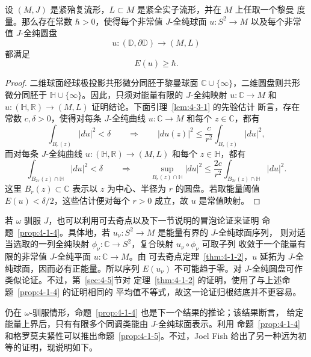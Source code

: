 \begin{proposition}\label{prop:4-1-4}
设 $(M,J)$ 是紧殆复流形，$L\subset M$ 是紧全实子流形，并在 $M$ 上任取一个黎曼
度量。那么存在常数 $\hbar>0$，使得每个非常值 $J$-全纯球面
$u:S^2\to M$ 以及每个非常值 $J$-全纯圆盘
\[
  u:(\mathbb D,\partial\mathbb D)\longrightarrow(M,L)
\]
都满足
\[
  E(u)\ge\hbar.
\]
\end{proposition}

\begin{proof}
二维球面经球极投影共形微分同胚于黎曼球面
$\mathbb C\cup\{\infty\}$，二维圆盘则共形微分同胚于
$\mathbb H\cup\{\infty\}$。因此，只须对能量有限的 $J$-全纯映射
$u:\mathbb C\to M$ 和
$u:(\mathbb H,\mathbb R)\to(M,L)$ 证明结论。下面引理~\ref{lem:4-3-1} 的先验估计
断言，存在常数 $c,\delta>0$，使得对每条 $J$-全纯曲线 $u:\mathbb C\to M$ 和每个
$z\in\mathbb C$，都有
\[
  \int_{B_r(z)}|du|^2<\delta
  \qquad\Longrightarrow\qquad
  |du(z)|^2
  \le\frac{c}{r^2}\int_{B_r(z)}|du|^2,
\]
而对每条 $J$-全纯曲线
$u:(\mathbb H,\mathbb R)\to(M,L)$ 和每个 $z\in\mathbb H$，都有
\[
  \int_{B_{2r}(z)\cap\mathbb H}|du|^2<\delta
  \qquad\Longrightarrow\qquad
  \sup_{B_r(z)\cap\mathbb H}|du|^2
  \le\frac{2c}{r^2}
  \int_{B_{2r}(z)\cap\mathbb H}|du|^2.
\]
这里 $B_r(z)\subset\mathbb C$ 表示以 $z$ 为中心、半径为 $r$ 的圆盘。若取能量阈值
$E(u)<\delta/2$，这些估计便对每个 $r>0$ 成立，故 $u$ 是常值映射。
\end{proof}

若 $\omega$ 驯服 $J$，也可以利用可去奇点以及下一节说明的冒泡论证来证明
命题~\ref{prop:4-1-4}。具体地，若 $u_\nu:S^2\to M$ 是能量有界的 $J$-全纯球面序列，
则对适当选取的一列全纯映射 $\phi_\nu:\mathbb C\to S^2$，复合映射
$u_\nu\circ\phi_\nu$ 可取子列
收敛于一个能量有限的非常值 $J$-全纯平面 $u:\mathbb C\to M$。由
可去奇点定理~\ref{thm:4-1-2}，$u$ 延拓为 $J$-全纯球面，因而必有正能量。所以序列
$E(u_\nu)$ 不可能趋于零。对 $J$-全纯圆盘可作类似论证。不过，第~\ref{sec:4-5}节对
定理~\ref{thm:4-1-2} 的证明，使用了与上述命题~\ref{prop:4-1-4} 的证明相同的
平均值不等式，故这一论证归根结底并不更容易。

仍在 $\omega$-驯服情形，命题~\ref{prop:4-1-4} 也是下一个结果的推论；该结果断言，
给定能量上界后，只有有限多个同调类能由 $J$-全纯球面表示。利用
命题~\ref{prop:4-1-4} 和格罗莫夫紧性可以推出命题~\ref{prop:4-1-5}。不过，Joel Fish
给出了另一种远为初等的证明，现说明如下。

